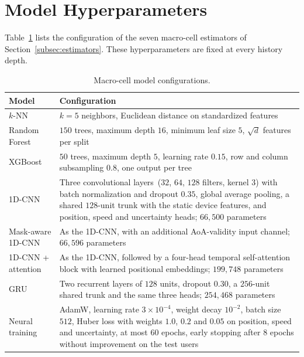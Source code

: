 \section{Model Hyperparameters}
\label{app:hyperparameters}

Table~\ref{tab:hyperparameters} lists the configuration of the seven macro-cell estimators of Section~\ref{subsec:estimators}. These hyperparameters are fixed at every history depth.

\begin{table}[h]
  \centering
  \caption{Macro-cell model configurations.}
  \label{tab:hyperparameters}
  \small
  \begin{tabularx}{\textwidth}{@{}lX@{}}
    \toprule
    Model & Configuration \\
    \midrule
    $k$-NN & $k=5$ neighbors, Euclidean distance on standardized features \\
    Random Forest & $150$ trees, maximum depth $16$, minimum leaf size $5$, $\sqrt{d}$ features per split \\
    XGBoost & $50$ trees, maximum depth $5$, learning rate $0.15$, row and column subsampling $0.8$, one output per tree \\
    1D-CNN & Three convolutional layers~($32$, $64$, $128$ filters, kernel $3$) with batch normalization and dropout $0.35$, global average pooling, a shared $128$-unit trunk with the static device features, and position, speed and uncertainty heads; $66{,}500$ parameters \\
    Mask-aware 1D-CNN & As the 1D-CNN, with an additional AoA-validity input channel; $66{,}596$ parameters \\
    1D-CNN + attention & As the 1D-CNN, followed by a four-head temporal self-attention block with learned positional embeddings; $199{,}748$ parameters \\
    GRU & Two recurrent layers of $128$ units, dropout $0.30$, a $256$-unit shared trunk and the same three heads; $254{,}468$ parameters \\
    Neural training & AdamW, learning rate $3\times10^{-4}$, weight decay $10^{-2}$, batch size $512$, Huber loss with weights $1.0$, $0.2$ and $0.05$ on position, speed and uncertainty, at most $60$ epochs, early stopping after $8$ epochs without improvement on the test users \\
    \bottomrule
  \end{tabularx}
\end{table}
